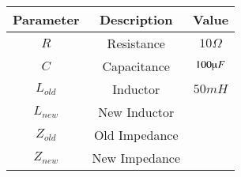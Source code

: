 \begin{tabular}{|c|c|c|}
\hline
   \textbf{Parameter}  & \textbf{Description} & \textbf{Value}\\
   \hline
   $R$   & Resistance & $10 \Omega$\\
   \hline
  $C$ & Capacitance & $100 \micro F$ \\
  \hline
  $L_{old}$ & Inductor & $50mH$\\
  \hline
  $L_{new}$ & New Inductor &    \\
  \hline
  $Z_{old}$ & Old Impedance & \\
  \hline
  $Z_{new}$ &New Impedance & \\
  \hline
  
\end{tabular}
